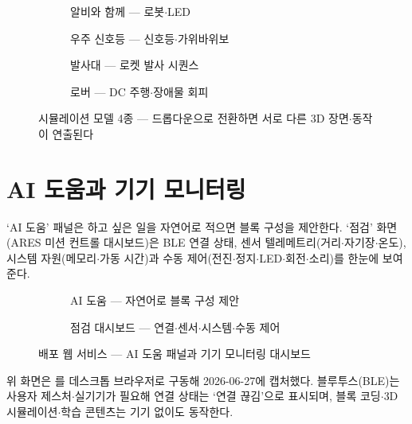 \begin{figure}[htbp]\centering
  \begin{subfigure}{0.49\linewidth}\centering
    \caption{알비와 함께 — 로봇$\cdot$LED}
  \end{subfigure}\hfill
  \begin{subfigure}{0.49\linewidth}\centering
    \caption{우주 신호등 — 신호등$\cdot$가위바위보}
  \end{subfigure}

  \medskip
  \begin{subfigure}{0.49\linewidth}\centering
    \caption{발사대 — 로켓 발사 시퀀스}
  \end{subfigure}\hfill
  \begin{subfigure}{0.49\linewidth}\centering
    \caption{로버 — DC 주행$\cdot$장애물 회피}
  \end{subfigure}
  \caption{시뮬레이션 모델 4종 — 드롭다운으로 전환하면 서로 다른 3D 장면$\cdot$동작이 연출된다}
\end{figure}

\section{AI 도움과 기기 모니터링}
‘AI 도움’ 패널은 하고 싶은 일을 자연어로 적으면 블록 구성을 제안한다. ‘점검’
화면(ARES 미션 컨트롤 대시보드)은 BLE 연결 상태, 센서 텔레메트리(거리$\cdot$자기장$\cdot$온도),
시스템 자원(메모리$\cdot$가동 시간)과 수동 제어(전진$\cdot$정지$\cdot$LED$\cdot$회전$\cdot$소리)를
한눈에 보여 준다.

\begin{figure}[htbp]\centering
  \begin{subfigure}{0.49\linewidth}\centering
    \caption{AI 도움 — 자연어로 블록 구성 제안}
  \end{subfigure}\hfill
  \begin{subfigure}{0.49\linewidth}\centering
    \caption{점검 대시보드 — 연결$\cdot$센서$\cdot$시스템$\cdot$수동 제어}
  \end{subfigure}
  \caption{배포 웹 서비스 — AI 도움 패널과 기기 모니터링 대시보드}
\end{figure}

\begin{notebox}[캡처 환경]
위 화면은 를 데스크톱 브라우저로 구동해 2026-06-27에
캡처했다. 블루투스(BLE)는 사용자 제스처$\cdot$실기기가 필요해 연결 상태는 ‘연결 끊김’으로
표시되며, 블록 코딩$\cdot$3D 시뮬레이션$\cdot$학습 콘텐츠는 기기 없이도 동작한다.
\end{notebox}


